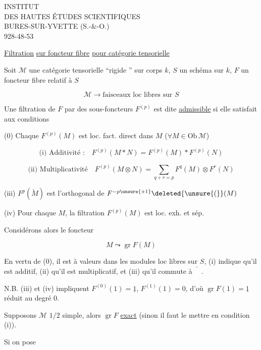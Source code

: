 
INSTITUT\\
DES HAUTES ÉTUDES SCIENTIFIQUES\\
BURES-SUR-YVETTE (S.-\&-O.)\\
928-48-53

\uline{Filtration} \uline{sur foncteur fibre} \uline{pour catégorie tensorielle}

Soit  $\mathcal M$ une catégorie tensorielle  ``rigide '' sur corps $k$, $S$ un schéma sur $k$, $F$ un foncteur fibre relatif à $S$

\[
\mathcal M\longrightarrow\text{faisceaux loc libres sur } S
\]

Une filtration de $F$ par des sous-foncteurs $F^{(p)}$ est dite \uline{admissible} si elle satisfait aux conditions

(0) Chaque $F^{(p)}(M)$ est loc. fact. direct dans $M$ ($\forall M\in\mathrm{Ob}\,\mathcal M$)

\[
\text{(i) Additivité :}\quad F^{(p)}(M\ast N)=F^{(p)}(M)\ast F^{(p)}(N)
\]

\[
\text{(ii) Multiplicativité}\quad F^{(p)}(M\otimes N)=\sum_{q+r=p}F^q(M)\otimes F^r(N)
\]

(iii) $F^p(\check M)$ est l'orthogonal de $F^{-p\unsure{+1}}\deleted{\unsure{(}}(M)$

(iv) Pour chaque $M$, la filtration $F^{(p)}(M)$ est loc. exh. et sép.

Considérons alors le foncteur

\[
M\leadsto\operatorname{gr}F(M)
\]

En vertu de (0), il est à valeurs dans les modules loc libres  sur $S$, (i) indique qu'il est additif, (ii) qu'il est multiplicatif, et (iii) qu'il commute à $\check{\phantom M}$.

 N.B.  (iii) et (iv) impliquent $F^{(0)}(1)=\underline{1}$, $F^{(1)}(1)=0$, d'où $\operatorname{gr}F(1)=\underline{1}$ réduit au degré $0$.

Supposons $\mathcal M$ $1/2$ simple, alors $\operatorname{gr}F$ \uline{exact} (sinon il faut le mettre en condition  (i)).

Si on pose

